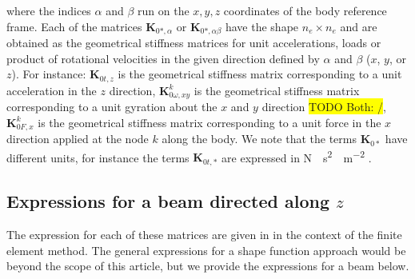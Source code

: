 \documentclass[wes, manuscript]{copernicus}
\newcommand{\m}[1]{\boldsymbol{#1}}
\newcommand{\todoBoth}    [1]{{\colorbox{yellow}{TODO Both:    }}{\color{red}{#1}}\colorbox{yellow}{/}}
\begin{document}
where the indices $\alpha$ and $\beta$ run on the $x, y, z$ coordinates of the body reference frame. 
Each of the matrices $\m{K}_{0*,\alpha}$ or $\m{K}_{0*,\alpha\beta}$ have the shape $n_e\times n_e$ and are obtained as the geometrical stiffness matrices for unit accelerations, loads or product of rotational velocities in the given direction defined by $\alpha$ and $\beta$ ($x$, $y$, or $z$).
For instance: $\m{K}_{0t,z}$ is the geometrical stiffness matrix corresponding to a unit acceleration in the $z$ direction, 
$\m{K}_{0\omega,xy}^k$ is the geometrical stiffness matrix corresponding to a unit gyration about the $x$ and $y$ direction
\todoBoth{Should be ok like that},
    $\m{K}_{0F,x}^k$ is the geometrical stiffness matrix corresponding to a unit force in the $x$ direction applied at the node $k$ along the body. 
% 
We note that the terms $\m{K}_{0*}$ have different units, for instance the terms $\m{K}_{0t,*}$ are expressed in \unit{N\cdot s^2 \cdot m^{-2}} .

\subsection{Expressions for a beam directed along $z$}
The expression for each of these matrices are given in \cite{Schwertassek:book} in the context of the finite element method.  The general expressions for a shape function approach would be beyond the scope of this article, but we provide the expressions for a beam below.
\end{document}
